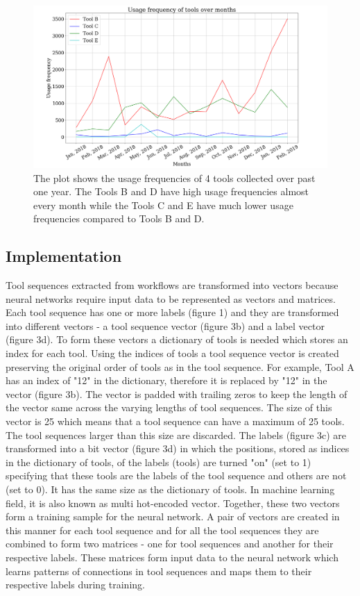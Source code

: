 \documentclass{bioinfo}
\begin{document}
\begin{figure}
\centerline{\includegraphics[scale=0.17]{bioinformatics_journal/images/usage_tools.png}}
\caption{The plot shows the usage frequencies of 4 tools collected over past one year. The Tools B and D have high usage frequencies almost every month while the Tools C and E have much lower usage frequencies compared to Tools B and D.}\label{figure:02}
\end{figure}

\subsection{Implementation}
Tool sequences extracted from workflows are transformed into vectors because neural networks require input data to be represented as vectors and matrices. Each tool sequence has one or more labels (figure 1) and they are transformed into different vectors - a tool sequence vector (figure 3b) and a label vector (figure 3d). To form these vectors a dictionary of tools is needed which stores an index for each tool. Using the indices of tools a tool sequence vector is created preserving the original order of tools as in the tool sequence. For example, Tool A has an index of "12" in the dictionary, therefore it is replaced by "12" in the vector (figure 3b). The vector is padded with trailing zeros to keep the length of the vector same across the varying lengths of tool sequences. The size of this vector is 25 which means that a tool sequence can have a maximum of 25 tools. The tool sequences larger than this size are discarded. The labels (figure 3c) are transformed into a bit vector (figure 3d) in which the positions, stored as indices in the dictionary of tools, of the labels (tools) are turned "on" (set to 1) specifying that these tools are the labels of the tool sequence and others are not (set to 0). It has the same size as the dictionary of tools. In machine learning field, it is also known as multi hot-encoded vector. Together, these two vectors form a training sample for the neural network. A pair of vectors are created in this manner for each tool sequence and for all the tool sequences they are combined to form two matrices - one for tool sequences and another for their respective labels. These matrices form input data to the neural network which learns patterns of connections in tool sequences and maps them to their respective labels during training.
\end{document}
